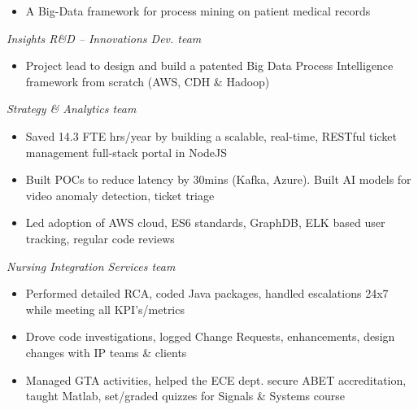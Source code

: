 \documentclass[10pt,a4paper,ragged2e,withhyper]{altacv}
\begin{document}
\begin{paracol}{2}


\begin{itemize}
\item A Big-Data framework for process mining on patient medical records  
\end{itemize}


\emph{Insights R\&D -- Innovations Dev. team}
\begin{itemize}
\item Project lead to design and build a patented Big Data Process Intelligence framework from scratch (AWS, CDH \& Hadoop)
\end{itemize}

\divider

\emph{Strategy \& Analytics team}
\begin{itemize}
\item Saved 14.3 FTE hrs/year by building a scalable, real-time, RESTful ticket management full-stack portal in NodeJS
\item Built POCs to reduce latency by 30mins (Kafka, Azure). Built AI models for video anomaly detection, ticket triage
\item Led adoption of AWS cloud, ES6 standards, GraphDB, ELK based user tracking, regular code reviews
\end{itemize}

\divider

\emph{Nursing Integration Services team}
\begin{itemize}
\item Performed detailed RCA, coded Java packages, handled escalations 24x7 while meeting all KPI’s/metrics
\item Drove code investigations, logged Change Requests, enhancements, design changes with IP teams \& clients
\end{itemize}

\divider

\begin{itemize}
\item Managed GTA activities, helped the ECE dept. secure ABET accreditation, taught Matlab, set/graded quizzes for Signals \& Systems course
\end{itemize}


\end{paracol}
\end{document}
